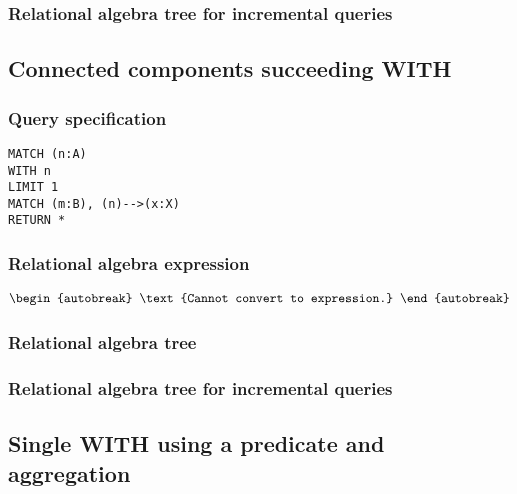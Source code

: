 \subsubsection*{Relational algebra tree for incremental queries}


\subsection{Connected components succeeding WITH}

\subsubsection*{Query specification}

\begin{lstlisting}
MATCH (n:A)
WITH n
LIMIT 1
MATCH (m:B), (n)-->(x:X)
RETURN *
\end{lstlisting}

\subsubsection*{Relational algebra expression}

\begin{align*}
\begin{autobreak}
\text{Cannot convert to expression.}
\end{autobreak}
\end{align*}

\subsubsection*{Relational algebra tree}


\subsubsection*{Relational algebra tree for incremental queries}


\subsection{Single WITH using a predicate and aggregation}

